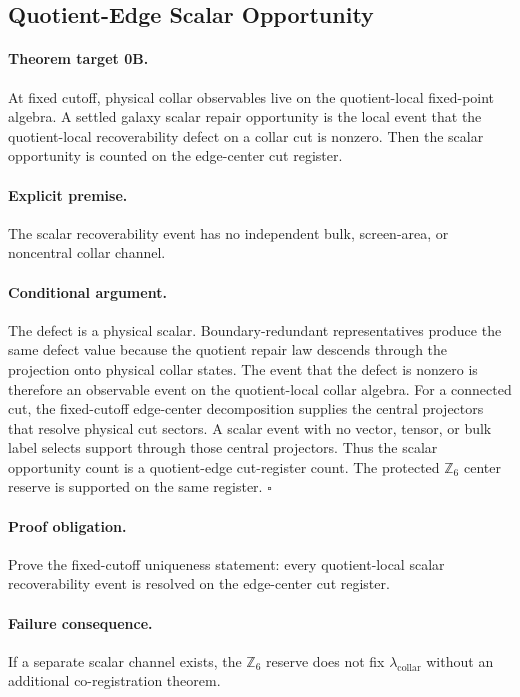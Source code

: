 \documentclass[11pt]{article}
\newcommand{\lambdac}{\lambda_{\mathrm{collar}}}
\newcommand{\Zsix}{\mathbb Z_6}
\begin{document}
\subsection{Quotient-Edge Scalar Opportunity}

\paragraph{Theorem target 0B.}
At fixed cutoff, physical collar observables live on the quotient-local
fixed-point algebra.  A settled galaxy scalar repair opportunity is the local
event that the quotient-local recoverability defect on a collar cut is
nonzero.  Then the scalar opportunity is counted on the edge-center cut
register.

\paragraph{Explicit premise.}
The scalar recoverability event has no independent bulk, screen-area, or
noncentral collar channel.

\paragraph{Conditional argument.}
The defect is a physical scalar.  Boundary-redundant representatives produce
the same defect value because the quotient repair law descends through the
projection onto physical collar states.  The event that the defect is nonzero
is therefore an observable event on the quotient-local collar algebra.  For a
connected cut, the fixed-cutoff edge-center decomposition supplies the central
projectors that resolve physical cut sectors.  A scalar event with no vector,
tensor, or bulk label selects support through those central projectors.  Thus
the scalar opportunity count is a quotient-edge cut-register count.  The
protected \(\Zsix\) center reserve is supported on the same register.
\(\square\)

\paragraph{Proof obligation.}
Prove the fixed-cutoff uniqueness statement: every quotient-local scalar
recoverability event is resolved on the edge-center cut register.

\paragraph{Failure consequence.}
If a separate scalar channel exists, the \(\Zsix\) reserve does not fix
\(\lambdac\) without an additional co-registration theorem.
\end{document}
